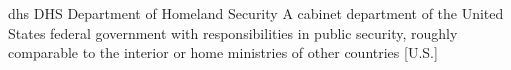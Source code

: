 \newglsXgovernment%
{dhs}%
{DHS}%
{Department of Homeland Security}%
{A cabinet department of the United States federal government with responsibilities in public security, roughly comparable to the interior or home ministries of other countries \cite{website:Department_of_Homeland_Security}}%
[U.S.]%